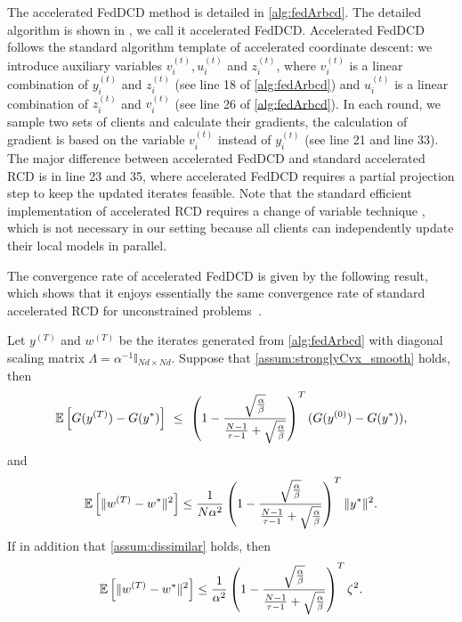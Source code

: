 The accelerated FedDCD method is detailed in \autoref{alg:fedArbcd}. 
The detailed algorithm is shown in , we call it accelerated FedDCD. Accelerated FedDCD follows the standard algorithm template of accelerated coordinate descent: we introduce auxiliary variables $v_i^{(t)}, u_i^{(t)}$ and $z_i^{(t)}$, where $v_i^{(t)}$ is a linear combination of $y_i^{(t)}$ and $z_i^{(t)}$ (see line 18 of \autoref{alg:fedArbcd}) and $u_i^{(t)}$ is a linear combination of $z_i^{(t)}$ and $v_i^{(t)}$ (see line 26 of \autoref{alg:fedArbcd}). In each round, we sample two sets of clients and calculate their gradients, the calculation of gradient is based on the variable $v_i^{(t)}$ instead of $y_i^{(t)}$ (see line 21 and line 33).
The major difference between accelerated FedDCD and standard accelerated RCD is in line 23 and 35, where accelerated FedDCD requires a partial projection step to keep the updated iterates feasible.
Note that the standard efficient implementation of accelerated RCD requires a  change of variable technique \citep{LeeS13}, which is not necessary in our setting because all clients can independently update their local models in parallel.

The convergence rate of accelerated FedDCD is given by the following result, which shows that it enjoys essentially the same convergence rate of standard accelerated RCD for unconstrained problems~\citep{LeeS13,Lu18}.

\begin{theorem} \label{thm:accFedDCDStronglyCVX}
    Let $y^{(T)}$ and $w^{(T)}$ be the iterates generated from \autoref{alg:fedArbcd} with diagonal scaling matrix $\Lambda = \alpha^{-1} \mathbb{I}_{Nd \times Nd}$. Suppose that \autoref{assum:stronglyCvx_smooth} holds, then
   \begin{equation} \label{eq:necoaraDualConvergenceStrongCVXAcc}
       \mathbb{E} \left[ G( y^{(T)} ) - G( y^* ) \right] ~\leq~ \left( 1 - \frac{ \sqrt{\frac{\alpha}{\beta}} }{ \frac{N-1}{\tau -1}+ \sqrt{\frac{\alpha}{\beta}} } \right)^{T} ( G(y^{(0)}) - G(y^*) ),
   \end{equation}
   and
   \begin{equation} \label{eq:necoaraPrimalConvergenceStrongCVXAcc}
       \mathbb{E} \left[ \| w^{(T)} - w^* \|^2 \right] 
       \leq \frac{1}{N\alpha^2} \left( 1 - \frac{ \sqrt{\frac{\alpha}{\beta}} }{ \frac{N-1}{\tau -1}+ \sqrt{\frac{\alpha}{\beta}} } \right)^{T} \|y^*\|^2.
   \end{equation}
   If in addition that \autoref{assum:dissimilar} holds, then
   \begin{equation} \label{eq:necoaraPrimalConvergenceDissimilarAcc}
       \mathbb{E} \left[ \| w^{(T)} - w^* \|^2 \right] 
       \leq \frac{1}{\alpha^2} \left( 1 - \frac{ \sqrt{\frac{\alpha}{\beta}} }{ \frac{N-1}{\tau -1}+ \sqrt{\frac{\alpha}{\beta}} } \right)^{T} \zeta^2. 
   \end{equation}
\end{theorem}

